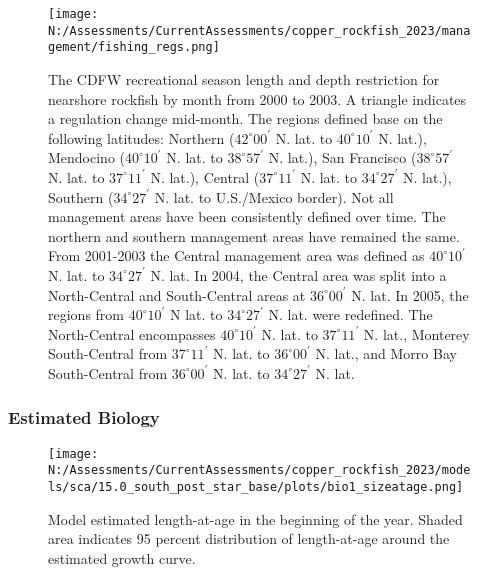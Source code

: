 \documentclass[11pt,
  english,
  letterpaper,
]{article}
\begin{document}
\begin{figure}
\centering
\texttt{[image: N:/Assessments/CurrentAssessments/copper\_rockfish\_2023/management/fishing\_regs.png]}
\caption{The CDFW recreational season length and depth restriction for nearshore rockfish by month from 2000 to 2003. A triangle indicates a regulation change mid-month. The regions defined base on the following latitudes: Northern (\(42^\circ 00^\prime\) N. lat. to \(40^\circ 10^\prime\) N. lat.), Mendocino (\(40^\circ 10^\prime\) N. lat. to \(38^\circ 57^\prime\) N. lat.), San Francisco (\(38^\circ 57^\prime\) N. lat. to \(37^\circ 11^\prime\) N. lat.), Central (\(37^\circ 11^\prime\) N. lat. to \(34^\circ 27^\prime\) N. lat.), Southern (\(34^\circ 27^\prime\) N. lat. to U.S./Mexico border). Not all management areas have been consistently defined over time. The northern and southern management areas have remained the same. From 2001-2003 the Central management area was defined as \(40^\circ 10^\prime\) N. lat. to \(34^\circ 27^\prime\) N. lat. In 2004, the Central area was split into a North-Central and South-Central areas at \(36^\circ 00^\prime\) N. lat. In 2005, the regions from \(40^\circ 10^\prime\) N lat. to \(34^\circ 27^\prime\) N. lat. were redefined. The North-Central encompasses \(40^\circ 10^\prime\) N. lat. to \(37^\circ 11^\prime\) N. lat., Monterey South-Central from \(37^\circ 11^\prime\) N. lat. to \(36^\circ 00^\prime\) N. lat., and Morro Bay South-Central from \(36^\circ 00^\prime\) N. lat. to \(34^\circ 27^\prime\) N. lat.\label{fig:depth-closures}}
\end{figure}

\pagebreak

\hypertarget{estimated-biology}{%
\subsubsection{Estimated Biology}\label{estimated-biology}}

\begin{figure}
\centering
\texttt{[image: N:/Assessments/CurrentAssessments/copper\_rockfish\_2023/models/sca/15.0\_south\_post\_star\_base/plots/bio1\_sizeatage.png]}
\caption{Model estimated length-at-age in the beginning of the year. Shaded area indicates 95 percent distribution of length-at-age around the estimated growth curve.\label{fig:mod-est-len-age}}
\end{figure}

\pagebreak
\end{document}
